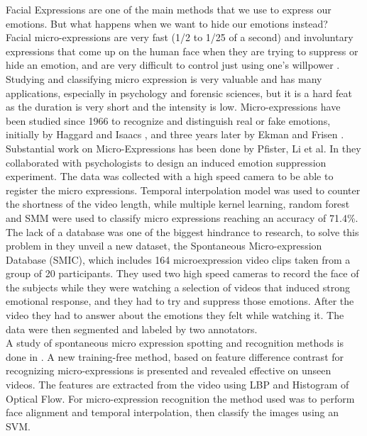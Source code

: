 Facial Expressions are one of the main methods that we use to express our emotions. But what happens when we want to hide our emotions instead? \\
Facial micro-expressions are very fast (1/2 to 1/25 of a second) and involuntary expressions that come up on the human face when they are trying to suppress or hide an emotion, and are very difficult to control just using one's willpower \cite{EkmanER}. 
Studying and classifying micro expression is very valuable and has many applications, especially in psychology and forensic sciences, but it is a hard feat as the duration is very short and the intensity is low. 
Micro-expressions have been studied since 1966 to recognize and distinguish real or fake emotions, initially by Haggard and Isaacs \cite{Haggard}, and three years later by Ekman and Frisen \cite{EkmanLeakage}. \\
Substantial work on Micro-Expressions has been done by Pfister, Li et al. In \cite{pfister2011micro} they collaborated with psychologists to design an induced emotion suppression experiment. The data was collected with a high speed camera to be able to register the micro expressions. Temporal interpolation model was used to counter the shortness of the video length, while multiple kernel learning, random forest and SMM were used to classify micro expressions reaching an accuracy of 71.4\%. \\
The lack of a database was one of the biggest hindrance to research, to solve this problem in  \cite{xli2012spontaneous} they unveil a new dataset, the Spontaneous Micro-expression Database (SMIC), which includes 164 microexpression video clips taken from a group of 20 participants. They used two high speed cameras to record the face of the subjects while they were watching a selection of videos that induced strong emotional response, and they had to try and suppress those emotions. After the video they had to answer about the emotions they felt while watching it. The data were then segmented and labeled by two annotators. \\
A study of spontaneous micro expression spotting and recognition methods is done in \cite{xli2015reading}. A new training-free method, based on feature difference contrast for recognizing micro-expressions is presented and revealed effective on unseen videos.
The features are extracted from the video using LBP and Histogram of Optical Flow. 
For micro-expression recognition the method used was to perform face alignment and temporal interpolation, then classify the images using an SVM. 
